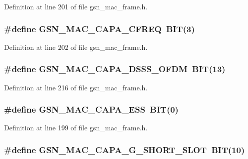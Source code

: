 Definition at line 201 of file gsn\_\-mac\_\-frame.h.

\hypertarget{a00523_a4718f541af499d4bc8615181a3b47669}{
\subsubsection[{GSN\_\-MAC\_\-CAPA\_\-CFREQ}]{\setlength{\rightskip}{0pt plus 5cm}\#define GSN\_\-MAC\_\-CAPA\_\-CFREQ~BIT(3)}}
\label{a00523_a4718f541af499d4bc8615181a3b47669}


Definition at line 202 of file gsn\_\-mac\_\-frame.h.

\hypertarget{a00523_aeaff7d5464936f85df44f5ffe7e45372}{
\subsubsection[{GSN\_\-MAC\_\-CAPA\_\-DSSS\_\-OFDM}]{\setlength{\rightskip}{0pt plus 5cm}\#define GSN\_\-MAC\_\-CAPA\_\-DSSS\_\-OFDM~BIT(13)}}
\label{a00523_aeaff7d5464936f85df44f5ffe7e45372}


Definition at line 216 of file gsn\_\-mac\_\-frame.h.

\hypertarget{a00523_ad3fcd60f256b619cfdbc021fe7557868}{
\subsubsection[{GSN\_\-MAC\_\-CAPA\_\-ESS}]{\setlength{\rightskip}{0pt plus 5cm}\#define GSN\_\-MAC\_\-CAPA\_\-ESS~BIT(0)}}
\label{a00523_ad3fcd60f256b619cfdbc021fe7557868}


Definition at line 199 of file gsn\_\-mac\_\-frame.h.

\hypertarget{a00523_a101962b6cfc1160ab9637260022980fc}{
\subsubsection[{GSN\_\-MAC\_\-CAPA\_\-G\_\-SHORT\_\-SLOT}]{\setlength{\rightskip}{0pt plus 5cm}\#define GSN\_\-MAC\_\-CAPA\_\-G\_\-SHORT\_\-SLOT~BIT(10)}}
\label{a00523_a101962b6cfc1160ab9637260022980fc}


